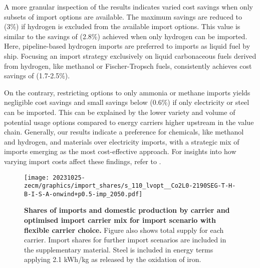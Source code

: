 
A more granular inspection of the results indicates varied cost savings when
only subsets of import options are available. The maximum savings are reduced to
 (3\%) if hydrogen is excluded from the available import options.
This value is similar to the savings of  (2.8\%) achieved when only
hydrogen can be imported. Here, pipeline-based hydrogen imports are preferred to
imports as liquid fuel by ship.
Focusing an import strategy exclusively on
liquid carbonaceous fuels derived from hydrogen, like methanol or
Fischer-Tropsch fuels, consistently achieves cost savings of 
(1.7-2.5\%).

On the contrary, restricting options to only ammonia or methane imports yields
negligible cost savings and small savings below  (0.6\%) if only
electricity or steel can be imported. This can be explained by the lower variety
and volume of potential usage options compared to energy carriers higher
upstream in the value chain. Generally, our results indicate a preference for
chemicals, like methanol and hydrogen, and materials over electricity imports,
with a strategic mix of imports emerging as the most cost-effective approach.
For insights into how varying import costs affect these findings, refer to
.

\begin{figure}[!htb]
    \texttt{[image: 20231025-zecm/graphics/import\_shares/s\_110\_lvopt\_\_Co2L0-2190SEG-T-H-B-I-S-A-onwind+p0.5-imp\_2050.pdf]}
    \caption{\textbf{Shares of imports and domestic production by carrier and optimised import carrier mix for import scenario with flexible carrier choice.}
        Figure also shows total supply for each carrier.
        Import shares for further import scenarios are included in the supplementary material.
        Steel is included in energy terms applying 2.1 kWh/kg as released by the oxidation of iron.
    }
    \label{fig:import-shares}
\end{figure}


